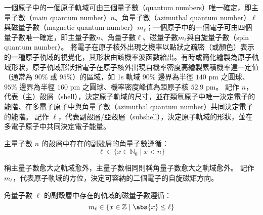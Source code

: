 \documentclass[a4paper,12pt]{report}
\begin{document}
一個原子中的一個原子軌域可由三個量子數（quantum numbers）唯一確定，即主量子數（main quantum number）$n$、角量子數（azimuthal quantum number）$\ell$與磁量子數（magnetic quantum number）$m_\ell$；一個原子中的一個電子可由四個量子數唯一確定，即主量子數$n$、角量子數$\ell$、磁量子數$m_\ell$與自旋量子數（spin quantum number）。
將電子在原子核外出現之機率以點狀之疏密（或顏色）表示的一種原子軌域的視覺化，其形狀由該機率波函數給出。有時或簡化繪製為原子軌域形狀，原子軌域形狀指電子在原子核外出現自機率密度高繪製累積機率達一定值（通常為 $90\%$ 或 $95\%$）的區域，如 1s 軌域 $90\%$ 邊界為半徑 $140$ pm 之圓球、$95\%$ 邊界為半徑 $160$ pm 之圓球、機率密度峰值為距原子核 $52.9$ pm。
記作 $n$，代表（主）殼層（shell），決定原子軌域的尺寸，並在類氫原子中唯一決定電子的能階、在多電子原子中與角量子數（azimuthal quantum number）共同決定電子的能階。
記作 $\ell$，代表副殼層/亞殼層（subshell），決定原子軌域的形狀，並在多電子原子中共同決定電子能量。

主量子數 $n$ 的殼層中存在的副殼層的角量子數遵循：
\[\ell\in\{x\in\mathbb{N}_0\mid x<n\}\]

稱主量子數愈大之軌域愈外，主量子數相同則稱角量子數愈大之軌域愈外。
記作 $m_\ell$，代表原子軌域的方位，決定可容納的二個電子的自旋磁矩方向。

角量子數 $\ell$ 的副殼層中存在的軌域的磁量子數遵循：
\[m_\ell\in\{x\in\mathbb{Z}\mid\abs{x}\leq\ell\}\]
\end{document}
